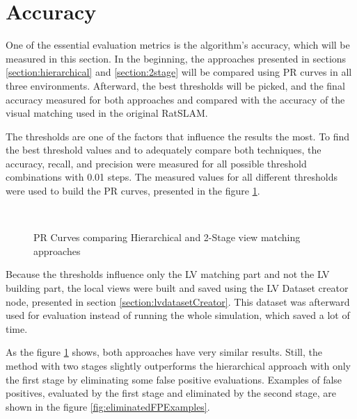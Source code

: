 \section{Accuracy}\label{section:accuracy}

One of the essential evaluation metrics is the algorithm's accuracy, which will be measured in this section. In the beginning, the approaches presented in sections \ref{section:hierarchical} and \ref{section:2stage} will be compared using PR curves in all three environments. Afterward, the best thresholds will be picked, and the final accuracy measured for both approaches and compared with the accuracy of the visual matching used in the original RatSLAM.\par
The thresholds are one of the factors that influence the results the most. To find the best threshold values and to adequately compare both techniques, the accuracy, recall, and precision were measured for all possible threshold combinations with 0.01 steps. The measured values for all different thresholds were used to build the PR curves, presented in the figure \ref{fig:prCurves}.\par

\begin{figure}[!tbp]
    \centering
    \hfill
    \\
    \caption{PR Curves comparing Hierarchical and 2-Stage view matching approaches}
    \label{fig:prCurves}
\end{figure}


Because the thresholds influence only the LV matching part and not the LV building part, the local views were built and saved using the LV Dataset creator node, presented in section \ref{section:lvdatasetCreator}. This dataset was afterward used for evaluation instead of running the whole simulation, which saved a lot of time.\par
As the figure \ref{fig:prCurves} shows, both approaches have very similar results. Still, the method with two stages slightly outperforms the hierarchical approach with only the first stage by eliminating some false positive evaluations. Examples of false positives, evaluated by the first stage and eliminated by the second stage, are shown in the figure \ref{fig:eliminatedFPExamples}.\par

